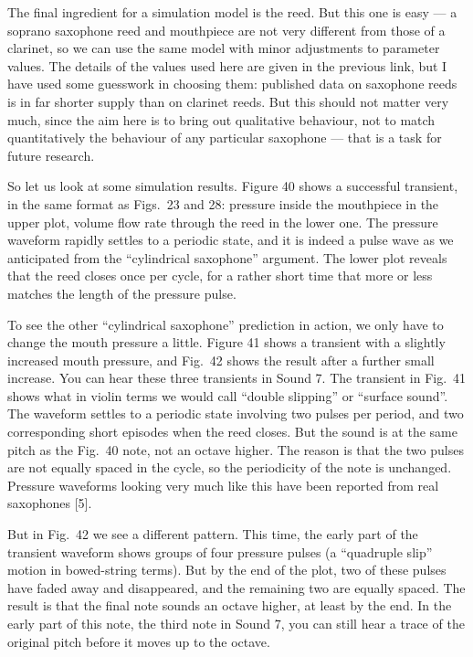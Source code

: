   The final ingredient for a simulation model is the reed. But this one is easy 
  — a soprano saxophone reed and mouthpiece are not very different from those 
  of a clarinet, so we can use the same model with minor adjustments to 
  parameter values. The details of the values used here are given in the 
  previous link, but I have used some guesswork in choosing them: published 
  data on saxophone reeds is in far shorter supply than on clarinet reeds. But 
  this should not matter very much, since the aim here is to bring out 
  qualitative behaviour, not to match quantitatively the behaviour of any 
  particular saxophone — that is a task for future research. 

  So let us look at some simulation results. Figure 40 shows a successful 
  transient, in the same format as Figs.\ 23 and 28: pressure inside the 
  mouthpiece in the upper plot, volume flow rate through the reed in the lower 
  one. The pressure waveform rapidly settles to a periodic state, and it is 
  indeed a pulse wave as we anticipated from the “cylindrical saxophone” 
  argument. The lower plot reveals that the reed closes once per cycle, for a 
  rather short time that more or less matches the length of the pressure pulse. 

  To see the other “cylindrical saxophone” prediction in action, we only have 
  to change the mouth pressure a little. Figure 41 shows a transient with a 
  slightly increased mouth pressure, and Fig.\ 42 shows the result after a 
  further small increase. You can hear these three transients in Sound 7. The 
  transient in Fig.\ 41 shows what in violin terms we would call “double 
  slipping” or “surface sound”. The waveform settles to a periodic state 
  involving two pulses per period, and two corresponding short episodes when 
  the reed closes. But the sound is at the same pitch as the Fig.\ 40 note, not 
  an octave higher. The reason is that the two pulses are not equally spaced in 
  the cycle, so the periodicity of the note is unchanged. Pressure waveforms 
  looking very much like this have been reported from real saxophones [5]. 

  But in Fig.\ 42 we see a different pattern. This time, the early part of the 
  transient waveform shows groups of four pressure pulses (a “quadruple slip” 
  motion in bowed-string terms). But by the end of the plot, two of these 
  pulses have faded away and disappeared, and the remaining two are equally 
  spaced. The result is that the final note sounds an octave higher, at least 
  by the end. In the early part of this note, the third note in Sound 7, you 
  can still hear a trace of the original pitch before it moves up to the 
  octave. 

